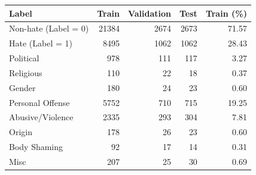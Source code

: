 \begin{tabular}{lrrrr}
\toprule
Label & Train & Validation & Test & Train (\%) \\
\midrule
Non-hate (Label = 0) & 21384 & 2674 & 2673 & 71.57 \\
Hate (Label = 1) & 8495 & 1062 & 1062 & 28.43 \\
Political & 978 & 111 & 117 & 3.27 \\
Religious & 110 & 22 & 18 & 0.37 \\
Gender & 180 & 24 & 23 & 0.60 \\
Personal Offense & 5752 & 710 & 715 & 19.25 \\
Abusive/Violence & 2335 & 293 & 304 & 7.81 \\
Origin & 178 & 26 & 23 & 0.60 \\
Body Shaming & 92 & 17 & 14 & 0.31 \\
Misc & 207 & 25 & 30 & 0.69 \\
\bottomrule
\end{tabular}
